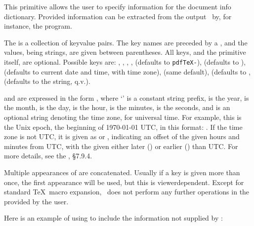 \documentclass{pdftexmanual}
\begin{document}
This primitive allows the user to specify information for the document
info dictionary. Provided information can be extracted from the output
\PDF\ by, for instance, the  program.

The  is a collection of key\hyph value\hyph
pairs. The key names are preceded by a \type{/}, and the values, being
strings, are given between parentheses. All keys, and the primitive
itself, are optional. Possible
keys are:\newline
{},\newline
{},\newline
{},\newline
{},\newline
{} (defaults to \hbox{\tt pdfTeX-\currentpdftex}),\newline
{} (defaults to ),\newline
{} (defaults to current date and time, with time zone),\newline
{} (same default),\newline
{} (defaults to ,\newline
{} (defaults to the  string, q.v.).

 and  are expressed in the form
, where `' is a constant string
prefix,  is the year,  is the month,  is
the day,  is the hour,  is the minutes,  is
the seconds, and  is an optional string denoting the time zone,
 for universal time. For example, this is the Unix epoch, the
beginning of 1970-01-01 UTC, in this format: .
If the time zone is not UTC, it is given as  or
, indicating an offset of the given hours and minutes from
UTC, with the given either later (\type{+}) or earlier (\type{-}) than
UTC. For more details, see the \PDFReference, \S7.9.4.

Multiple appearances of  are concatenated. Usually if a key
is given more than once, the first appearance will be used, but this is
viewer\hyph dependent. Except for standard \TeX\ macro expansion,
\PDFTEX\ does not perform any further operations in the
 provided by the user.

Here is an example of using  to include the
information not supplied by \PDFTEX:
\end{document}
